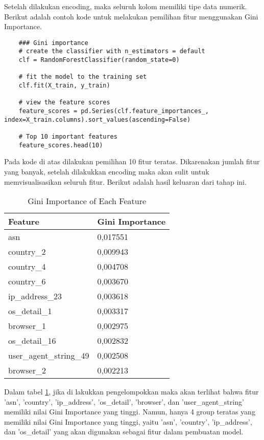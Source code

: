 Setelah dilakukan encoding, maka seluruh kolom memiliki tipe data numerik. Berikut adalah contoh kode untuk melakukan pemilihan fitur menggunakan Gini Importance.

\begin{lstlisting}
    ### Gini importance 
    # create the classifier with n_estimators = default
    clf = RandomForestClassifier(random_state=0)

    # fit the model to the training set
    clf.fit(X_train, y_train)

    # view the feature scores
    feature_scores = pd.Series(clf.feature_importances_, index=X_train.columns).sort_values(ascending=False)
    
    # Top 10 important features
    feature_scores.head(10) 
    \end{lstlisting}

    Pada kode di atas dilakukan pemilihan 10 fitur teratas. Dikarenakan jumlah fitur yang banyak, setelah dilakukkan encoding maka akan sulit untuk memvisualisasikan seluruh fitur.
    Berikut adalah hasil keluaran dari tahap ini.

    \begin{table}[H]
    \caption{Gini Importance of Each Feature}

    \centering
    \begin{tabular}{|l|l|}
    \hline
    \textbf{Feature} & \textbf{Gini Importance} \\ \hline
    asn & 0,017551 \\ 
    country\_2 & 0,009943 \\ 
    country\_4 & 0,004708 \\ 
    country\_6 & 0,003670 \\ 
    ip\_address\_23 & 0,003618 \\ 
    os\_detail\_1 & 0,003317 \\ 
    browser\_1 & 0,002975 \\ 
    os\_detail\_16 & 0,002832 \\ 
    user\_agent\_string\_49 & 0,002508 \\ 
    browser\_2 & 0,002213 \\ \hline
    \end{tabular}
    \label{tab:gini_importance}
    \end{table}

    Dalam tabel \ref{tab:gini_importance}, jika di lakukkan pengelompokkan maka akan terlihat bahwa fitur 'asn', 'country', 'ip\_address', 'os\_detail', 'browser', dan 'user\_agent\_string' memiliki nilai Gini Importance yang tinggi. 
    Namun, hanya 4 group teratas yang memiliki nilai Gini Importance yang tinggi, yaitu 'asn', 'country', 'ip\_address', dan 'os\_detail' yang akan digunakan sebagai fitur dalam pembuatan model.